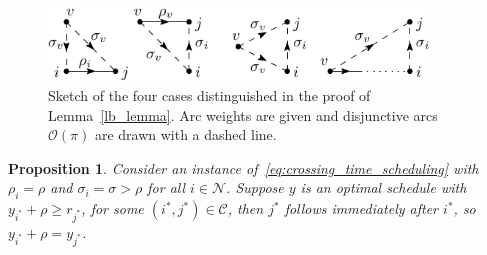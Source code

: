 \documentclass[a4paper]{article}
\theoremstyle{definition}
\theoremstyle{plain}
\newtheorem{proposition}{Proposition}
\begin{document}
\begin{figure}
  \centering
  \includegraphics[width=0.9\textwidth]{figures/lower-bound-lemma.pdf}
  \caption{Sketch of the four cases distinguished in the proof of
    Lemma~\ref{lb_lemma}. Arc weights are given and disjunctive arcs
    $\mathcal{O}(\pi)$ are drawn with a dashed line.}\label{fig:lb_lemma}
\end{figure}


\begin{proposition}\label{prop:exhaustive}
  Consider an instance of~\eqref{eq:crossing_time_scheduling} with
  $\rho_{i} = \rho$ and $\sigma_{i} = \sigma > \rho$ for all
  $i \in \mathcal{N}$. Suppose $y$ is an optimal schedule with
  $y_{i^{*}} + \rho \geq r_{j^{*}}$, for some $(i^{*},j^{*}) \in \mathcal{C}$,
  then $j^{*}$ follows immediately after $i^{*}$, so
  $y_{i^{*}} + \rho = y_{j^{*}}$.
\end{proposition}
\end{document}
